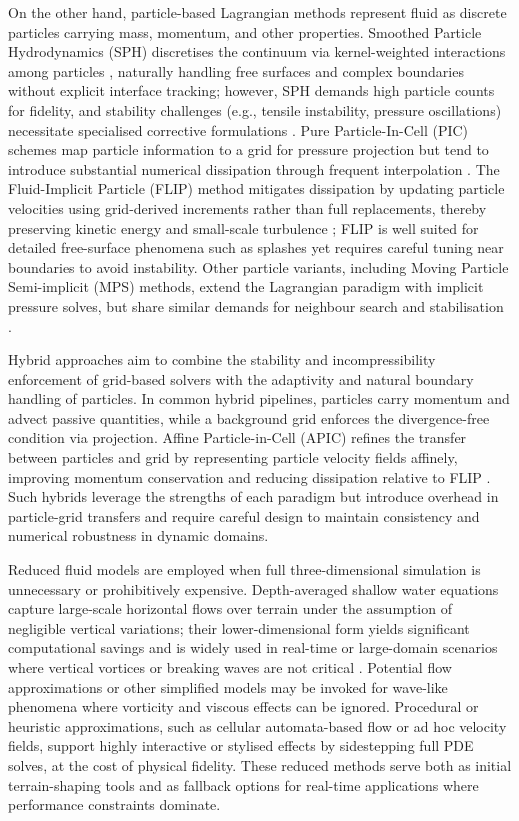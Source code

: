 On the other hand, particle-based Lagrangian methods represent fluid as discrete particles carrying mass, momentum, and other properties. Smoothed Particle Hydrodynamics (SPH) discretises the continuum via kernel-weighted interactions among particles \cite{Monaghan2005}, naturally handling free surfaces and complex boundaries without explicit interface tracking; however, SPH demands high particle counts for fidelity, and stability challenges (e.g., tensile instability, pressure oscillations) necessitate specialised corrective formulations \cite{Monaghan2005,Koschier2022}. Pure Particle-In-Cell (PIC) schemes map particle information to a grid for pressure projection but tend to introduce substantial numerical dissipation through frequent interpolation \cite{Harlow1962}. The Fluid-Implicit Particle (FLIP) method mitigates dissipation by updating particle velocities using grid-derived increments rather than full replacements, thereby preserving kinetic energy and small-scale turbulence \cite{Brackbill1988}; FLIP is well suited for detailed free-surface phenomena such as splashes yet requires careful tuning near boundaries to avoid instability. Other particle variants, including Moving Particle Semi-implicit (MPS) methods, extend the Lagrangian paradigm with implicit pressure solves, but share similar demands for neighbour search and stabilisation \cite{Koshizuka1996}.

Hybrid approaches aim to combine the stability and incompressibility enforcement of grid-based solvers with the adaptivity and natural boundary handling of particles. In common hybrid pipelines, particles carry momentum and advect passive quantities, while a background grid enforces the divergence-free condition via projection. Affine Particle-in-Cell (APIC) refines the transfer between particles and grid by representing particle velocity fields affinely, improving momentum conservation and reducing dissipation relative to FLIP \cite{Jiang2015}. Such hybrids leverage the strengths of each paradigm but introduce overhead in particle-grid transfers and require careful design to maintain consistency and numerical robustness in dynamic domains.

Reduced fluid models are employed when full three-dimensional simulation is unnecessary or prohibitively expensive. Depth-averaged shallow water equations capture large-scale horizontal flows over terrain under the assumption of negligible vertical variations; their lower-dimensional form yields significant computational savings and is widely used in real-time or large-domain scenarios where vertical vortices or breaking waves are not critical \cite{Vreugdenhil1994,Pan2012}. Potential flow approximations or other simplified models may be invoked for wave-like phenomena where vorticity and viscous effects can be ignored. Procedural or heuristic approximations, such as cellular automata-based flow or ad hoc velocity fields, support highly interactive or stylised effects by sidestepping full PDE solves, at the cost of physical fidelity. These reduced methods serve both as initial terrain-shaping tools and as fallback options for real-time applications where performance constraints dominate.

